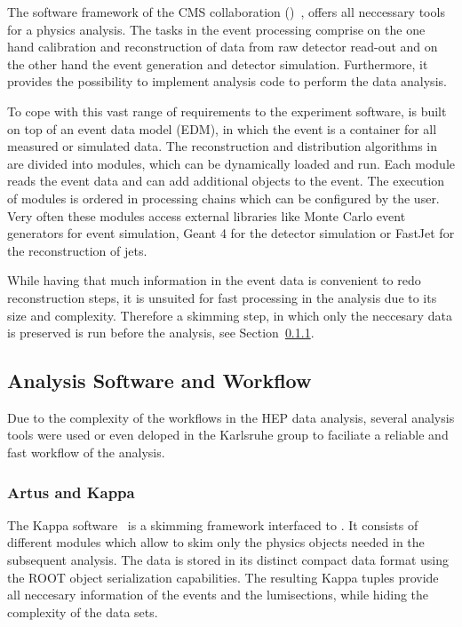 The software framework of the CMS collaboration (\CMSSW)~\cite{Bayatyan:838359}, offers
all neccessary tools for a physics analysis. The tasks in the event processing
comprise on the one hand calibration and reconstruction of data from raw
detector read-out and on the other hand the event generation and detector
simulation. Furthermore, it provides the possibility to implement analysis code
to perform the data analysis. 

To cope with this vast range of requirements to the experiment software, \CMSSW
is built on top of an event data model (EDM), in which the event is a
container for all measured or simulated data. The reconstruction and
distribution algorithms in \CMSSW are divided into modules, which can be
dynamically loaded and run. Each module reads the event data and can add additional
objects to the event. The execution of modules is ordered
in processing chains which can be configured by the user. Very often these modules
access external libraries like Monte Carlo event generators for event
simulation, Geant 4 for the detector simulation or FastJet for the
reconstruction of jets. 

While having that much information in the event data is convenient to redo
reconstruction steps, it is unsuited for fast processing in the analysis due to
its size and complexity. Therefore a skimming step, in which only the neccesary
data is preserved is run before the analysis, see Section~\ref{artus_kappa}.

\subsection{Analysis Software and Workflow}

Due to the complexity of the workflows in the HEP data analysis, several
analysis tools were used or even deloped in the Karlsruhe group to faciliate a reliable and
fast workflow of the analysis. 

\subsubsection{Artus and Kappa}
\label{artus_kappa}

The Kappa software~\cite{Kappa:2015aa} is a skimming framework interfaced to
\CMSSW. It consists of different modules which allow to skim only the physics
objects needed in the subsequent analysis. The data is stored in its distinct
compact data format using the ROOT object serialization capabilities. The
resulting Kappa tuples provide all neccesary information of the events and the
lumisections, while hiding the complexity of the \CMSSW data sets.

